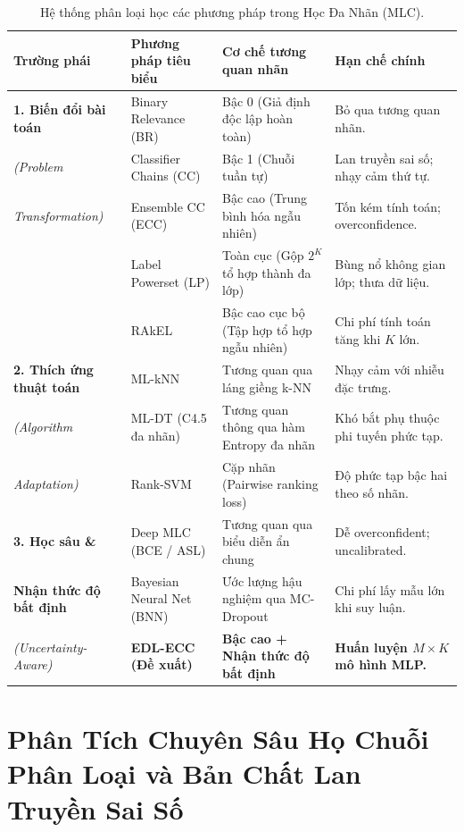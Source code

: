 \documentclass[1p,times]{elsarticle}
\begin{document}
\begin{table}[htbp]
\centering
\caption{Hệ thống phân loại học các phương pháp trong Học Đa Nhãn (MLC).}
\label{tab:taxonomy_comparison}
\small
\begin{tabular*}{\textwidth}{@{\extracolsep{\fill}}lp{3.2cm}p{3.8cm}p{3.6cm}}
\toprule
\textbf{Trường phái} & \textbf{Phương pháp tiêu biểu} & \textbf{Cơ chế tương quan nhãn} & \textbf{Hạn chế chính} \\
\midrule
\textbf{1. Biến đổi bài toán} & Binary Relevance (BR) & Bậc 0 (Giả định độc lập hoàn toàn) & Bỏ qua tương quan nhãn. \\
\textit{(Problem} & Classifier Chains (CC) & Bậc 1 (Chuỗi tuần tự) & Lan truyền sai số; nhạy cảm thứ tự. \\
\textit{Transformation)} & Ensemble CC (ECC) & Bậc cao (Trung bình hóa ngẫu nhiên) & Tốn kém tính toán; overconfidence. \\
 & Label Powerset (LP) & Toàn cục (Gộp $2^K$ tổ hợp thành đa lớp) & Bùng nổ không gian lớp; thưa dữ liệu. \\
 & RAkEL & Bậc cao cục bộ (Tập hợp tổ hợp ngẫu nhiên) & Chi phí tính toán tăng khi $K$ lớn. \\
\midrule
\textbf{2. Thích ứng thuật toán} & ML-kNN & Tương quan qua láng giềng k-NN & Nhạy cảm với nhiễu đặc trưng. \\
\textit{(Algorithm} & ML-DT (C4.5 đa nhãn) & Tương quan thông qua hàm Entropy đa nhãn & Khó bắt phụ thuộc phi tuyến phức tạp. \\
\textit{Adaptation)} & Rank-SVM & Cặp nhãn (Pairwise ranking loss) & Độ phức tạp bậc hai theo số nhãn. \\
\midrule
\textbf{3. Học sâu \&} & Deep MLC (BCE / ASL) & Tương quan qua biểu diễn ẩn chung & Dễ overconfident; uncalibrated. \\
\textbf{Nhận thức độ bất định} & Bayesian Neural Net (BNN) & Ước lượng hậu nghiệm qua MC-Dropout & Chi phí lấy mẫu lớn khi suy luận. \\
\textit{(Uncertainty-Aware)} & \textbf{EDL-ECC (Đề xuất)} & \textbf{Bậc cao + Nhận thức độ bất định} & \textbf{Huấn luyện $M \times K$ mô hình MLP.} \\
\bottomrule
\end{tabular*}
\end{table}

\section{Phân Tích Chuyên Sâu Họ Chuỗi Phân Loại và Bản Chất Lan Truyền Sai Số}
\label{sec:chain_family}
\end{document}
